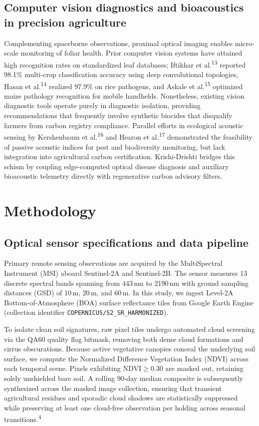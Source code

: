 \documentclass[a4paper,10pt]{article}
\begin{document}
\subsection{Computer vision diagnostics and bioacoustics in precision agriculture}
Complementing spaceborne observations, proximal optical imaging enables micro-scale monitoring of foliar health. Prior computer vision systems have attained high recognition rates on standardized leaf databases; Iftikhar et al.\textsuperscript{13} reported 98.1\% multi-crop classification accuracy using deep convolutional topologies, Hasan et al.\textsuperscript{14} realized 97.9\% on rice pathogens, and Askale et al.\textsuperscript{15} optimized maize pathology recognition for mobile handhelds. Nonetheless, existing vision diagnostic tools operate purely in diagnostic isolation, providing recommendations that frequently involve synthetic biocides that disqualify farmers from carbon registry compliance. Parallel efforts in ecological acoustic sensing by Kershenbaum et al.\textsuperscript{16} and Hearon et al.\textsuperscript{17} demonstrated the feasibility of passive acoustic indices for pest and biodiversity monitoring, but lack integration into agricultural carbon certification. Krishi-Drishti bridges this schism by coupling edge-computed optical disease diagnosis and auxiliary bioacoustic telemetry directly with regenerative carbon advisory filters.


\section{Methodology}

\subsection{Optical sensor specifications and data pipeline}
Primary remote sensing observations are acquired by the MultiSpectral Instrument (MSI) aboard Sentinel-2A and Sentinel-2B. The sensor measures 13 discrete spectral bands spanning from 443\,nm to 2190\,nm with ground sampling distances (GSD) of 10\,m, 20\,m, and 60\,m. In this study, we ingest Level-2A Bottom-of-Atmosphere (BOA) surface reflectance tiles from Google Earth Engine (collection identifier \texttt{COPERNICUS/S2\_SR\_HARMONIZED}).

To isolate clean soil signatures, raw pixel tiles undergo automated cloud screening via the QA60 quality flag bitmask, removing both dense cloud formations and cirrus obscurations. Because active vegetative canopies conceal the underlying soil surface, we compute the Normalized Difference Vegetation Index (NDVI) across each temporal scene. Pixels exhibiting $\text{NDVI} \geq 0.30$ are masked out, retaining solely unshielded bare soil. A rolling 90-day median composite is subsequently synthesized across the masked image collection, ensuring that transient agricultural residues and sporadic cloud shadows are statistically suppressed while preserving at least one cloud-free observation per holding across seasonal transitions.\textsuperscript{4}
\end{document}
